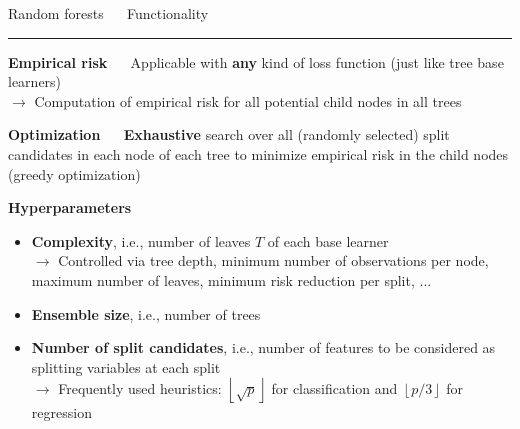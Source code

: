 \documentclass[11pt,compress,t,notes=noshow, xcolor=table]{beamer}
\begin{document}

\LARGE
\begin{frame}{\textcolor{gray!80}{Random forests} ~~ Functionality}
\normalsize
\vspace{-0.5cm}
\noindent \textcolor{gray!80}{\rule{\textwidth}{1pt}}

\vspace{0.3cm}

\footnotesize

\textbf{\textcolor{gray!80}{Empirical risk}} ~~
Applicable with \textbf{any} kind of loss function (just like tree base learners) 
\\
$\rightarrow$ Computation of empirical risk for all potential child nodes in all 
trees

\medskip

\textbf{\textcolor{gray!80}{Optimization}} ~~ \textbf{Exhaustive} search over
all (randomly selected) split candidates in each node of each tree to minimize
empirical risk in the child nodes (greedy optimization) \\

\medskip

\textbf{\textcolor{gray!80}{Hyperparameters}}

\begin{itemize}
  \item \textbf{Complexity}, i.e., number of leaves $T$ of each base learner \\
  $\rightarrow$ Controlled via tree depth, minimum number of observations per 
  node, maximum number of leaves, minimum risk reduction per split, ...
  \item \textbf{Ensemble size}, i.e., number of trees
  \item \textbf{Number of split candidates}, i.e., number of features to be
  considered as splitting variables at each split \\
  $\rightarrow$ Frequently used heuristics: 
  $\left \lfloor{\sqrt{p}}\right \rfloor$ for classification and
  $\left \lfloor{p/3}\right \rfloor$ for regression
  
\end{itemize}
  
\end{frame}


\end{document}
